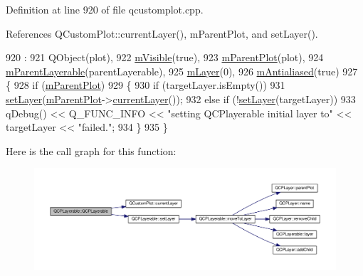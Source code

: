 Definition at line 920 of file qcustomplot.\+cpp.



References Q\+Custom\+Plot\+::current\+Layer(), m\+Parent\+Plot, and set\+Layer().


\begin{DoxyCode}
920                                                                                                 :
921   QObject(plot),
922   \hyperlink{class_q_c_p_layerable_a62e3aed8427d6ce3ccf716f285106cb3}{mVisible}(\textcolor{keyword}{true}),
923   \hyperlink{class_q_c_p_layerable_aa2a528433e44db02b8aef23c1f9f90ed}{mParentPlot}(plot),
924   \hyperlink{class_q_c_p_layerable_a3291445a980053e2d17a21d15957624e}{mParentLayerable}(parentLayerable),
925   \hyperlink{class_q_c_p_layerable_aa38ec5891aff0f50b36fd63e9372a0cd}{mLayer}(0),
926   \hyperlink{class_q_c_p_layerable_a3ab45a4c76a3333ce42eb217a81733ec}{mAntialiased}(\textcolor{keyword}{true})
927 \{
928   \textcolor{keywordflow}{if} (\hyperlink{class_q_c_p_layerable_aa2a528433e44db02b8aef23c1f9f90ed}{mParentPlot})
929   \{
930     \textcolor{keywordflow}{if} (targetLayer.isEmpty())
931       \hyperlink{class_q_c_p_layerable_ab0d0da6d2de45a118886d2c8e16d5a54}{setLayer}(\hyperlink{class_q_c_p_layerable_aa2a528433e44db02b8aef23c1f9f90ed}{mParentPlot}->\hyperlink{class_q_custom_plot_af73057345656cbd1463454982d808b00}{currentLayer}());
932     \textcolor{keywordflow}{else} \textcolor{keywordflow}{if} (!\hyperlink{class_q_c_p_layerable_ab0d0da6d2de45a118886d2c8e16d5a54}{setLayer}(targetLayer))
933       qDebug() << Q\_FUNC\_INFO << \textcolor{stringliteral}{"setting QCPlayerable initial layer to"} << targetLayer << \textcolor{stringliteral}{"failed."};
934   \}
935 \}
\end{DoxyCode}


Here is the call graph for this function\+:\nopagebreak
\begin{figure}[H]
\begin{center}
\leavevmode
\includegraphics[width=350pt]{class_q_c_p_layerable_a74c0fa237f29bf0e49565013fc5d1ec0_cgraph}
\end{center}
\end{figure}


